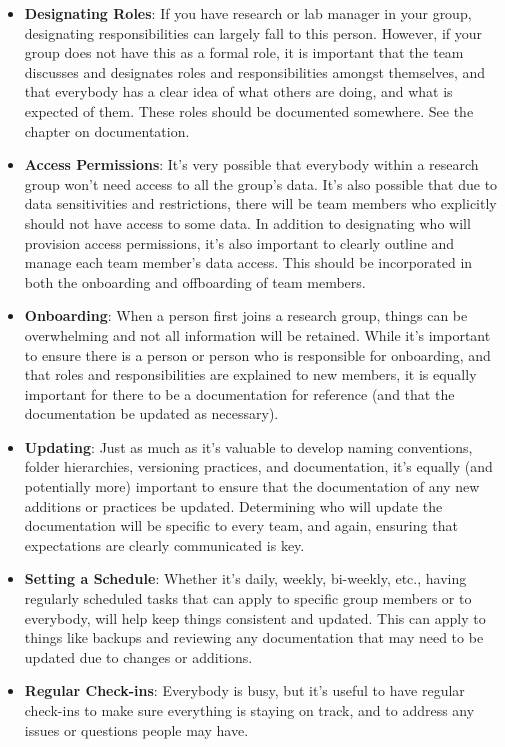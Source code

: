 \documentclass[
]{book}
\providecommand{\tightlist}{%
  \setlength{\itemsep}{0pt}\setlength{\parskip}{0pt}}
\begin{document}
\begin{itemize}
\tightlist
\item
  \textbf{Designating Roles}: If you have research or lab manager in your group, designating responsibilities can largely fall to this person. However, if your group does not have this as a formal role, it is important that the team discusses and designates roles and responsibilities amongst themselves, and that everybody has a clear idea of what others are doing, and what is expected of them. These roles should be documented somewhere. See the chapter on documentation.
\item
  \textbf{Access Permissions}: It's very possible that everybody within a research group won't need access to all the group's data. It's also possible that due to data sensitivities and restrictions, there will be team members who explicitly should not have access to some data. In addition to designating who will provision access permissions, it's also important to clearly outline and manage each team member's data access. This should be incorporated in both the onboarding and offboarding of team members.
\item
  \textbf{Onboarding}: When a person first joins a research group, things can be overwhelming and not all information will be retained. While it's important to ensure there is a person or person who is responsible for onboarding, and that roles and responsibilities are explained to new members, it is equally important for there to be a documentation for reference (and that the documentation be updated as necessary).
\item
  \textbf{Updating}: Just as much as it's valuable to develop naming conventions, folder hierarchies, versioning practices, and documentation, it's equally (and potentially more) important to ensure that the documentation of any new additions or practices be updated. Determining who will update the documentation will be specific to every team, and again, ensuring that expectations are clearly communicated is key.
\item
  \textbf{Setting a Schedule}: Whether it's daily, weekly, bi-weekly, etc., having regularly scheduled tasks that can apply to specific group members or to everybody, will help keep things consistent and updated. This can apply to things like backups and reviewing any documentation that may need to be updated due to changes or additions.
\item
  \textbf{Regular Check-ins}: Everybody is busy, but it's useful to have regular check-ins to make sure everything is staying on track, and to address any issues or questions people may have.
\end{itemize}
\end{document}
